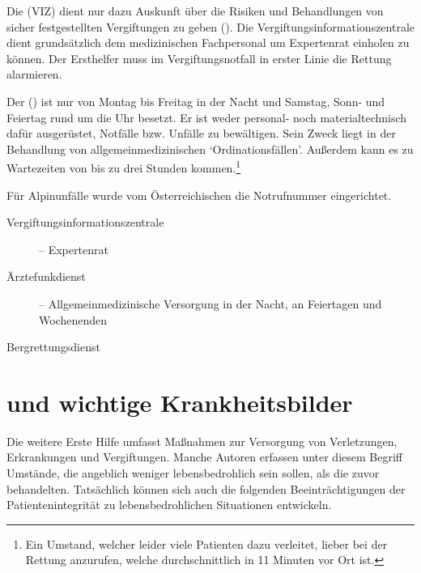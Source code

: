 {
Die
 (VIZ) dient nur dazu
Auskunft über die Risiken und Behandlungen von sicher
festgestellten Vergiftungen zu geben (). Die
Vergiftungsinformationszentrale dient grundsätzlich dem
medizinischen Fachpersonal um Expertenrat einholen zu
können. Der Ersthelfer muss im Vergiftungsnotfall in erster
Linie die Rettung alarmieren.

Der  ()
ist nur von Montag bis Freitag in der Nacht und Samstag, Sonn- und
Feiertag rund um die Uhr besetzt. Er
ist weder personal- noch materialtechnisch dafür
ausgerüstet, Notfälle bzw. Unfälle zu bewältigen. 
Sein Zweck liegt in der
Behandlung von allgemeinmedizinischen
\enquote*{Ordinationsfällen}. Außerdem kann es zu Wartezeiten von
bis zu drei Stunden kommen.\footnote{Ein Umstand,
welcher leider viele Patienten dazu verleitet, lieber bei
der Rettung anzurufen, welche durchschnittlich in 11 Minuten
vor Ort ist.}

Für Alpinunfälle wurde vom Österreichischen  die Notrufnummer  eingerichtet.
}{
\begin{description}
  \item[Vergiftungsinformationszentrale]  --
  Expertenrat
  \item[Ärztefunkdienst]  -- Allgemeinmedizinische Versorgung in
  der Nacht, an Feiertagen und Wochenenden
  \item[Bergrettungsdienst] 
\end{description}
}{}{}{}



\section{ und wichtige Krankheitsbilder}

\Text
{{\TxBeschreibung}}%
{%
Die weitere Erste Hilfe umfasst Maßnahmen zur Versorgung von
Verletzungen, Erkrankungen und Vergiftungen. Manche Autoren erfassen
unter diesem Begriff Umstände, die
angeblich weniger lebensbedrohlich sein sollen, als die zuvor behandelten. Tatsächlich
können sich auch die folgenden Beeinträchtigungen der
Patientenintegrität zu lebensbedrohlichen Situationen entwickeln. 
}%




